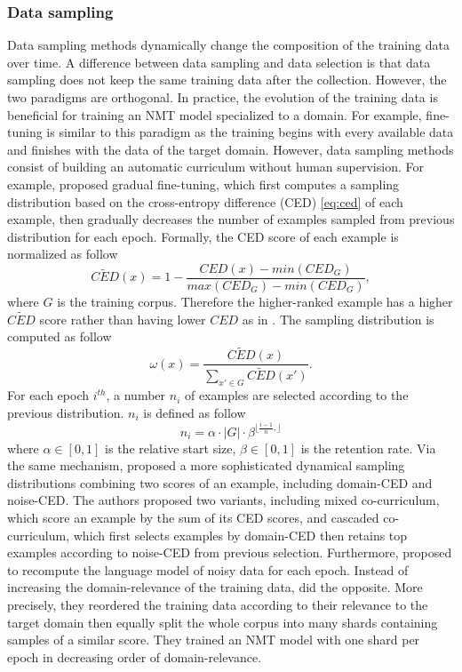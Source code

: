 \subsubsection{Data sampling}
Data sampling methods dynamically change the composition of the training data over time. A difference between data sampling and data selection is that data sampling does not keep the same training data after the collection. However, the two paradigms are orthogonal. In practice, the evolution of the training data is beneficial for training an NMT model specialized to a domain. For example, fine-tuning is similar to this paradigm as the training begins with every available data and finishes with the data of the target domain. However, data sampling methods consist of building an automatic curriculum without human supervision. For example, \citet{Wees17dynamic} proposed gradual fine-tuning, which first computes a sampling distribution based on the cross-entropy difference (CED) \eqref{eq:ced} of each example, then gradually decreases the number of examples sampled from previous distribution for each epoch. Formally, the CED score of each example is normalized as follow
\begin{equation}
\tilde{CED}(x) = 1 - \frac{CED(x)-min(CED_{G})}{max(CED_{G}) - min(CED_{G})},
\end{equation}
where $G$ is the training corpus. Therefore the higher-ranked example has a higher $\tilde{CED}$ score rather than having lower $CED$ as in \cite{Axelrod11domain}. The sampling distribution is computed as follow
\begin{equation}
\omega(x) = \frac{\tilde{CED}(x)}{\sum_{x'\in G} \tilde{CED}(x')}.
\end{equation}
For each epoch $i^{th}$, a number $n_i$ of examples are selected according to the previous distribution. $n_i$ is defined as follow
\begin{equation}
n_i = \alpha \cdot |G| \cdot \beta^{\lfloor \frac{i-1}{n}, \rfloor}
\end{equation}
where $\alpha \in [0,1]$ is the relative start size, $\beta \in [0,1]$ is the retention rate. Via the same mechanism, \citet{Wang19dynamically} proposed a more sophisticated dynamical sampling distributions combining two scores of an example, including domain-CED and noise-CED. The authors proposed two variants, including mixed co-curriculum, which score an example by the sum of its CED scores, and cascaded co-curriculum, which first selects examples by domain-CED then retains top examples according to noise-CED from previous selection. Furthermore, \citet{Wang19dynamically} proposed to recompute the language model of noisy data for each epoch. Instead of increasing the domain-relevance of the training data, \cite{Zhang19curriculum} did the opposite. More precisely, they reordered the training data according to their relevance to the target domain then equally split the whole corpus into many shards containing samples of a similar score. They trained an NMT model with one shard per epoch in decreasing order of domain-relevance.

